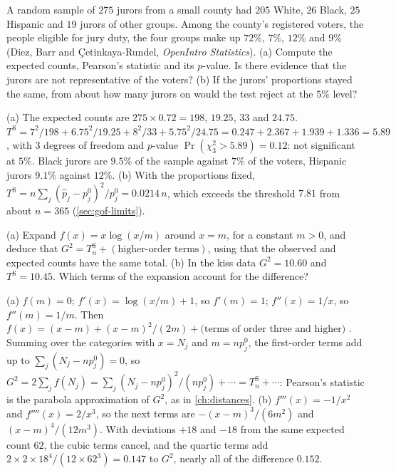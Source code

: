 \begin{exercise}
\label{ex:gof-jurors}
A random sample of $275$ jurors from a small county had $205$ White, $26$ Black, $25$ Hispanic and $19$ jurors of other groups. Among the county's registered voters, the people eligible for jury duty, the four groups make up $72\%$, $7\%$, $12\%$ and $9\%$ (Diez, Barr and \c{C}etinkaya-Rundel, \textit{OpenIntro Statistics}). (a) Compute the expected counts, Pearson's statistic and its $p$-value. Is there evidence that the jurors are not representative of the voters? (b) If the jurors' proportions stayed the same, from about how many jurors on would the test reject at the $5\%$ level?
\end{exercise}
\begin{solution}
(a) The expected counts are $275 \times 0.72 = 198$, $19.25$, $33$ and $24.75$. $T^{\mathrm{S}} = 7^2/198 + 6.75^2/19.25 + 8^2/33 + 5.75^2/24.75 = 0.247 + 2.367 + 1.939 + 1.336 = 5.89$, with $3$ degrees of freedom and $p$-value $\Pr(\chi^2_3 > 5.89) = 0.12$: not significant at $5\%$. Black jurors are $9.5\%$ of the sample against $7\%$ of the voters, Hispanic jurors $9.1\%$ against $12\%$. (b) With the proportions fixed, $T^{\mathrm{S}} = n\sum_j(\hat{p}_j - p^0_j)^2/p^0_j = 0.0214\,n$, which exceeds the threshold $7.81$ from about $n = 365$ (\cref{sec:gof-limits}).
\end{solution}

\begin{exercise}
\label{ex:gof-taylor}
(a) Expand $f(x) = x\log(x/m)$ around $x = m$, for a constant $m > 0$, and deduce that $G^2 = T^{\mathrm{S}}_n + (\text{higher-order terms})$, using that the observed and expected counts have the same total. (b) In the kiss data $G^2 = 10.60$ and $T^{\mathrm{S}} = 10.45$. Which terms of the expansion account for the difference?
\end{exercise}
\begin{solution}
(a) $f(m) = 0$; $f'(x) = \log(x/m) + 1$, so $f'(m) = 1$; $f''(x) = 1/x$, so $f''(m) = 1/m$. Then $f(x) = (x - m) + (x - m)^2/(2m) + \text{(terms of order three and higher)}$ . Summing over the categories with $x = N_j$ and $m = np^0_j$, the first-order terms add up to $\sum_j(N_j - np^0_j) = 0$, so $G^2 = 2\sum_jf(N_j) = \sum_j(N_j - np^0_j)^2/(np^0_j) + \cdots = T^{\mathrm{S}}_n + \cdots$: Pearson's statistic is the parabola approximation of $G^2$, as in \cref{ch:distances}. (b) $f'''(x) = -1/x^2$ and $f''''(x) = 2/x^3$, so the next terms are $-(x - m)^3/(6m^2)$ and $(x - m)^4/(12m^3)$. With deviations $+18$ and $-18$ from the same expected count $62$, the cubic terms cancel, and the quartic terms add $2 \times 2 \times 18^4/(12 \times 62^3) = 0.147$ to $G^2$, nearly all of the difference $0.152$.
\end{solution}

